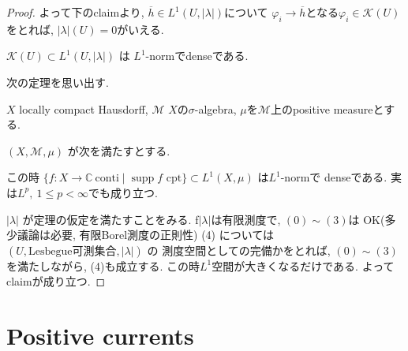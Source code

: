 \begin{proof}
よって下のclaimより, $\overline{h} \in L^1(U,|\lambda|)$について
$\varphi_i \to \overline{h}$となる$\varphi_i \in \mathcal{K}(U)$をとれば, 
$|\lambda|(U)=0$がいえる. 

\begin{claim}
\(\mathcal{K}(U)\subset L^1(U,|\lambda|)\) は
 \(L^1\)-normでdenseである. 
\end{claim}
次の定理を思い出す. 
\begin{tcolorbox}[mybox]
\begin{thm}\cite[Theorem 3.14]{Rud2}
\(X\) locally compact Hausdorff,  \(\mathcal{M}\) $X$の\(\sigma\)-algebra, 
\(\mu\)を\(\mathcal{M}\)上のpositive measureとする. 

 \((X,\mathcal{M},\mu)\) が次を満たすとする.

この時 \(\{f:X\to\mathbb{C}\ \text{conti} \mid \operatorname{supp} f \text{ cpt}\}\subset L^1(X,\mu)\)
は\(L^1\)-normで
denseである. 
実は$L^p,\ 1\leq p<\infty$でも成り立つ. 
\end{thm}
\end{tcolorbox}

\(|\lambda|\) が定理の仮定を満たすことをみる. 
f\(|\lambda|\)は有限測度で, 
$ (0)\sim (3)$は OK(多少議論は必要, 有限Borel測度の正則性)
(4) については \((U,\text{Lesbegue可測集合},|\lambda|)\) の
測度空間としての完備かをとれば, 
\((0)\sim(3)\) を満たしながら, (4)も成立する.
この時$L^1$空間が大きくなるだけである. よってclaimが成り立つ. 
\end{proof}


\section{Positive currents}


